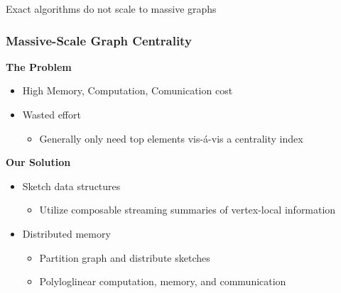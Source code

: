 \documentclass{beamer}
\begin{document}
\begin{frame}
\begin{columns}
\end{columns}

\begin{block}{}
	\begin{center}
		Exact algorithms do not scale to massive graphs
	\end{center}
\end{block}

\end{frame}


 \begin{frame}
\frametitle{Massive-Scale Graph Centrality}

\textbf{The Problem}
\begin{itemize}
	\item High Memory, Computation, Comunication cost
	\item Wasted effort 
	\begin{itemize}
		\item Generally only need top elements vis-\'a-vis a centrality index
	\end{itemize}
\end{itemize}
\textbf{Our Solution}
\begin{itemize}
	\item Sketch data structures
	\begin{itemize}
		\item Utilize composable streaming summaries of vertex-local information
	\end{itemize}
	\item Distributed memory
	\begin{itemize}
		\item Partition graph and distribute sketches
		\item Polyloglinear computation, memory, and communication
	\end{itemize}
\end{itemize}

\end{frame}

\end{document}
